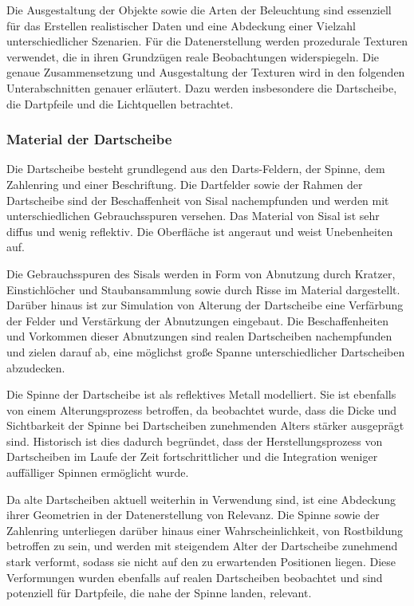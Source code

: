 Die Ausgestaltung der Objekte sowie die Arten der Beleuchtung sind essenziell für das Erstellen realistischer Daten und eine Abdeckung einer Vielzahl unterschiedlicher Szenarien. Für die Datenerstellung werden prozedurale Texturen verwendet, die in ihren Grundzügen reale Beobachtungen widerspiegeln. Die genaue Zusammensetzung und Ausgestaltung der Texturen wird in den folgenden Unterabschnitten genauer erläutert. Dazu werden insbesondere die Dartscheibe, die Dartpfeile und die Lichtquellen betrachtet.

\subsubsection{Material der Dartscheibe}

Die Dartscheibe besteht grundlegend aus den Darts-Feldern, der Spinne, dem Zahlenring und einer Beschriftung. Die Dartfelder sowie der Rahmen der Dartscheibe sind der Beschaffenheit von Sisal nachempfunden und werden mit unterschiedlichen Gebrauchsspuren versehen. Das Material von Sisal ist sehr diffus und wenig reflektiv. Die Oberfläche ist angeraut und weist Unebenheiten auf.

Die Gebrauchsspuren des Sisals werden in Form von Abnutzung durch Kratzer, Einstichlöcher und Staubansammlung sowie durch Risse im Material dargestellt. Darüber hinaus ist zur Simulation von Alterung der Dartscheibe eine Verfärbung der Felder und Verstärkung der Abnutzungen eingebaut. Die Beschaffenheiten und Vorkommen dieser Abnutzungen sind realen Dartscheiben nachempfunden und zielen darauf ab, eine möglichst große Spanne unterschiedlicher Dartscheiben abzudecken.

Die Spinne der Dartscheibe ist als reflektives Metall modelliert. Sie ist ebenfalls von einem Alterungsprozess betroffen, da beobachtet wurde, dass die Dicke und Sichtbarkeit der Spinne bei Dartscheiben zunehmenden Alters stärker ausgeprägt sind. Historisch ist dies dadurch begründet, dass der Herstellungsprozess von Dartscheiben im Laufe der Zeit fortschrittlicher und die Integration weniger auffälliger Spinnen ermöglicht wurde.

Da alte Dartscheiben aktuell weiterhin in Verwendung sind, ist eine Abdeckung ihrer Geometrien in der Datenerstellung von Relevanz. Die Spinne sowie der Zahlenring unterliegen darüber hinaus einer Wahrscheinlichkeit, von Rostbildung betroffen zu sein, und werden mit steigendem Alter der Dartscheibe zunehmend stark verformt, sodass sie nicht auf den zu erwartenden Positionen liegen. Diese Verformungen wurden ebenfalls auf realen Dartscheiben beobachtet und sind potenziell für Dartpfeile, die nahe der Spinne landen, relevant.

